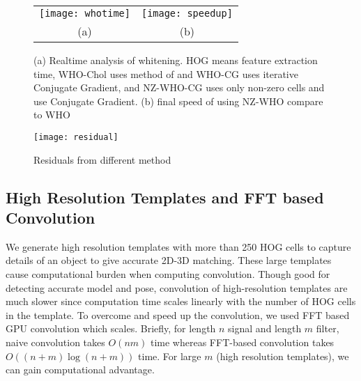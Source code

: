 \begin{figure}[t]
  \begin{center}
  \begin{tabular}{cc}
     \texttt{[image: whotime]} & 
     \texttt{[image: speedup]}\\
     (a) & (b) \\
 \end{tabular}
  \end{center}
  \caption{(a) Realtime analysis of whitening. HOG means feature extraction time, WHO-Chol uses method of \cite{Hariharan12} and WHO-CG uses iterative Conjugate Gradient, and NZ-WHO-CG uses only non-zero cells and use Conjugate Gradient. (b) final speed of using NZ-WHO compare to WHO}
  \label{fig:whotime}
\end{figure}
%
\begin{figure}[t]
  \centering
  \texttt{[image: residual]}
  \caption{Residuals from different method}
  \label{fig:whoresidual}
\end{figure}


\subsection{High Resolution Templates and FFT based Convolution}
\label{sec:fft} 
We generate high resolution templates with more than 250 HOG cells to capture
details of an object to give accurate 2D-3D matching. These large templates
cause computational burden when computing convolution. Though good for
detecting accurate model and pose, convolution of high-resolution templates are
much slower since computation time scales linearly with the number of HOG
cells in the template. To overcome and speed up the convolution, we used FFT
based GPU convolution \cite{Podlozhnyuk} which scales. Briefly, for length $n$ signal and
length $m$ filter, naive convolution takes $O(nm)$ time whereas FFT-based
convolution takes $O\left( (n + m)\log (n+m) \right)$ time. For large
$m$ (high resolution templates), we can gain computational advantage.
